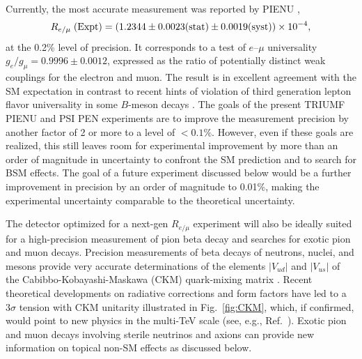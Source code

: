 \paragraph{}
Currently, the most accurate measurement was reported by PIENU \cite{Aguilar-Arevalo3},
\begin{equation}
\label{Remu_exp}
     R_{e/\mu} \hspace{0.1cm} \text{(Expt)} = (1.2344 \pm 0.0023 (\text{stat}) \pm 0.0019 (\text{syst})) \times 10^{-4},
\end{equation}
 at the 0.2\% level of precision. It corresponds to a test of $e$--$\mu$ universality $g_e/g_\mu = 0.9996 \pm 0.0012$, expressed as the ratio of potentially distinct weak couplings for the electron and muon. The result is in excellent agreement with the SM expectation in contrast to recent hints of violation of third generation lepton flavor universality in some $B$-meson decays \cite{LFVB}. The goals of the present TRIUMF PIENU \cite{Aguilar-Arevalo4, Aguilar-Arevalo5} and PSI PEN \cite{Pocanic1, Pocanic2, Pocanic3} experiments are to improve the measurement precision by another factor of 2 or more to a level of $<0.1\%$. However, even if these goals are realized, this still leaves room for experimental improvement by more than an order of magnitude in uncertainty to confront
the SM prediction and to search for BSM effects. The goal of a future experiment discussed below would be a further improvement in precision by an order of magnitude to 0.01\%, making the
experimental uncertainty comparable to the theoretical uncertainty.

The detector optimized for a next-gen $R_{e/\mu}$ experiment will also be ideally suited for a high-precision measurement of pion beta decay and searches for exotic pion and muon decays. Precision measurements of beta decays of neutrons,
nuclei, and mesons provide very accurate determinations of the elements $|V_{ud}|$ and $|V_{us}|$ of the
Cabibbo-Kobayashi-Maskawa (CKM) quark-mixing matrix \cite{Cabibbo, Kobayashi}. Recent theoretical
developments on radiative corrections and form factors have led to a $3\sigma$ tension with CKM
unitarity illustrated in Fig.~\ref{fig:CKM}, which, if confirmed, would point to new physics in the multi-TeV scale (see, e.g., Ref.~\cite{Czarnecki}).  Exotic pion and muon decays involving sterile neutrinos and axions can provide new information on topical non-SM effects as discussed below.

